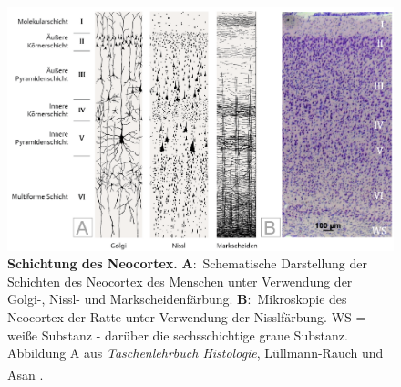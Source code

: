 \begin{figure}[H]
	\centering
	\includegraphics[width=\textwidth]{pictures/Bilder_Jule/Andere/neocortex_schichtung.png}
	\caption[Schichtung des Neocortex]{\textbf{Schichtung des Neocortex.} \textbf{A}:~Schematische Darstellung der Schichten des Neocortex des Menschen unter Verwendung der Golgi-, Nissl- und Markscheidenfärbung. \textbf{B}:~Mikroskopie des Neocortex der Ratte unter Verwendung der Nisslfärbung. WS = weiße Substanz - darüber die sechsschichtige graue Substanz.\\
	Abbildung A aus \textit{Taschenlehrbuch Histologie}, Lüllmann-Rauch und Asan \textsuperscript{\cite{taschenbuch_histologie}}.}
	\label{fig:neoccortex_schichtung}
\end{figure}

